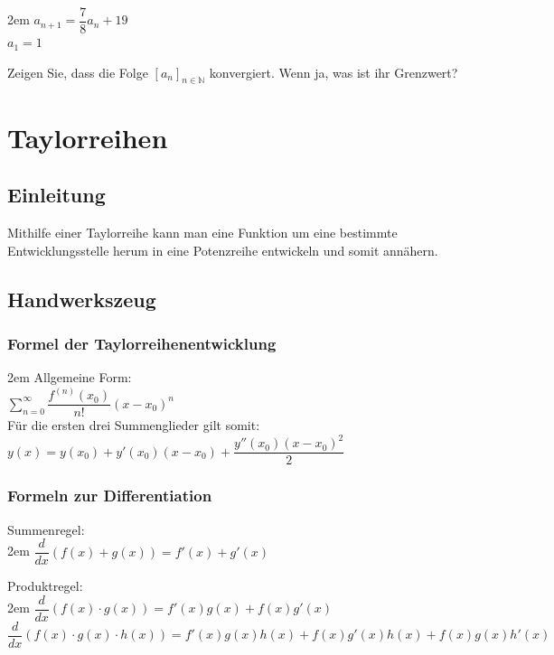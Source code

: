 \documentclass[11pt,final]{scrreprt}
\newcommand{\br} {\medskip\\}
\newcommand{\N} {\mathbb N}
\begin{document}
\begingroup
\leftskip2em 
$ a_{n+1} = \dfrac{7}{8} a_n + 19 $\\
$ a_1 = 1 $
\par	
\endgroup 
Zeigen Sie, dass die Folge $ [a_n]_{n\in\N} $ konvergiert. Wenn ja, was ist ihr Grenzwert?

\chapter{Taylorreihen}

\section{Einleitung}

Mithilfe einer Taylorreihe kann man eine Funktion um eine bestimmte Entwicklungsstelle herum in eine Potenzreihe entwickeln und somit annähern.

\section{Handwerkszeug}

\subsection*{Formel der Taylorreihenentwicklung}

\begingroup
\leftskip2em 
Allgemeine Form: \\
$ \sum\limits_{n=0}^{\infty} \dfrac{f^{(n)}(x_0)}{n!} (x-x_0)^n $\br
Für die ersten drei Summenglieder gilt somit:\\
$ y(x) = y(x_0)+y'(x_0)(x-x_0)+\dfrac{y''(x_0)(x-x_0)^2}{2} $\\
\par	
\endgroup 

\subsection*{Formeln zur Differentiation}

Summenregel:\\

\begingroup
\leftskip2em 
$ \dfrac{d}{dx} (f(x)+g(x)) = f'(x) + g'(x)$\\
\par	
\endgroup 

Produktregel:\\

\begingroup
\leftskip2em 
$ \dfrac{d}{dx} (f(x)\cdot g(x)) = f'(x)g(x)+f(x)g'(x)$\\
$ \dfrac{d}{dx} (f(x)\cdot g(x)\cdot h(x)) = f'(x)g(x)h(x)+f(x)g'(x)h(x)+f(x)g(x)h'(x)$\\
\par	
\endgroup 
\end{document}

